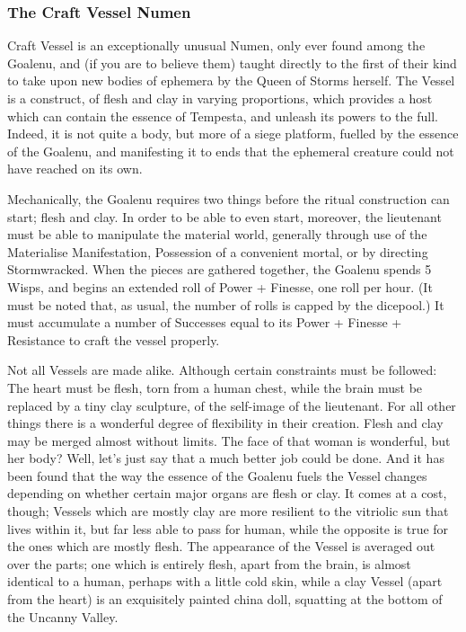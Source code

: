 \subsubsection*{The Craft Vessel Numen}

Craft Vessel is an exceptionally unusual Numen, only ever found among the Goalenu, and (if you are to believe them) taught directly to the first of their kind to take upon new bodies of ephemera by the Queen of Storms herself. The Vessel is a construct, of flesh and clay in varying proportions, which provides a host which can contain the essence of Tempesta, and unleash its powers to the full. Indeed, it is not quite a body, but more of a siege platform, fuelled by the essence of the Goalenu, and manifesting it to ends that the ephemeral creature could not have reached on its own.

Mechanically, the Goalenu requires two things before the ritual construction can start; flesh and clay. In order to be able to even start, moreover, the lieutenant must be able to manipulate the material world, generally through use of the Materialise Manifestation, Possession of a convenient mortal, or by directing Stormwracked. When the pieces are gathered together, the Goalenu spends 5 Wisps, and begins an extended roll of Power + Finesse, one roll per hour. (It must be noted that, as usual, the number of rolls is capped by the dicepool.) It must accumulate a number of Successes equal to its Power + Finesse + Resistance to craft the vessel properly.

Not all Vessels are made alike. Although certain constraints must be followed: The heart must be flesh, torn from a human chest, while the brain must be replaced by a tiny clay sculpture, of the self-image of the lieutenant. For all other things there is a wonderful degree of flexibility in their creation. Flesh and clay may be merged almost without limits. The face of that woman is wonderful, but her body? Well, let’s just say that a much better job could be done. And it has been found that the way the essence of the Goalenu fuels the Vessel changes depending on whether certain major organs are flesh or clay. It comes at a cost, though; Vessels which are mostly clay are more resilient to the vitriolic sun that lives within it, but far less able to pass for human, while the opposite is true for the ones which are mostly flesh. The appearance of the Vessel is averaged out over the parts; one which is entirely flesh, apart from the brain, is almost identical to a human, perhaps with a little cold skin, while 
a clay Vessel (apart from the heart) is an exquisitely painted china doll, squatting at the bottom of the Uncanny Valley.

